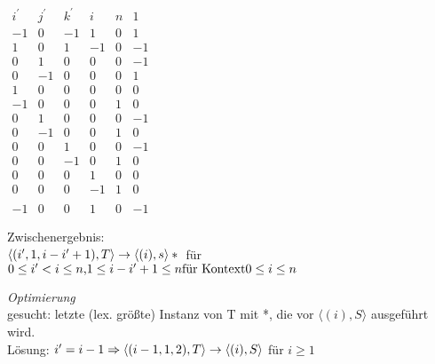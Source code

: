 \begin{\itemize}
$\begin{array}{cccccc}
i^\prime & j^\prime & k^\prime & i & n & 1  \\
-1       & 0        & -1       & 1 & 0 & 1  \\
1        & 0        & 1        & -1& 0 & -1 \\
0        & 1        & 0        & 0 & 0 & -1 \\
0        & -1       & 0        & 0 & 0 & 1  \\
1        & 0        & 0        & 0 & 0 & 0  \\
-1       & 0        & 0        & 0 & 1 & 0  \\
0        & 1        & 0        & 0 & 0 & -1 \\
0        & -1       & 0        & 0 & 1 & 0  \\
0        & 0        & 1        & 0 & 0 & -1 \\
0        & 0        & -1       & 0 & 1 & 0  \\
0        & 0        & 0        & 1 & 0 & 0  \\
0        & 0        & 0        &-1 & 1 & 0  \\
{}&{}&{}&{}&{}&{}\\
-1       & 0        & 0        & 1 & 0 &-1	
\end{array}$

Zwischenergebnis: \\$\langle (i^\prime, 1, i-i^\prime+1), T \rangle \rightarrow \langle (i), s \rangle *\\$ für $ 0 \leq i^\prime < i \leq n \text{,} 1\leq i-i^\prime + 1 \leq n \\
\text{für Kontext} 0\leq i \leq n$

\item \textit{Optimierung}\\
    gesucht: letzte (lex. größte) Instanz von T mit *, die vor $\langle (i), S \rangle$ ausgeführt wird. \\
    Lösung: $i^\prime = i-1\\
            \Rightarrow \langle (i-1,1,2), T \rangle \rightarrow \langle (i), S \rangle$ für $i \geq 1$
\end{\itemize}

